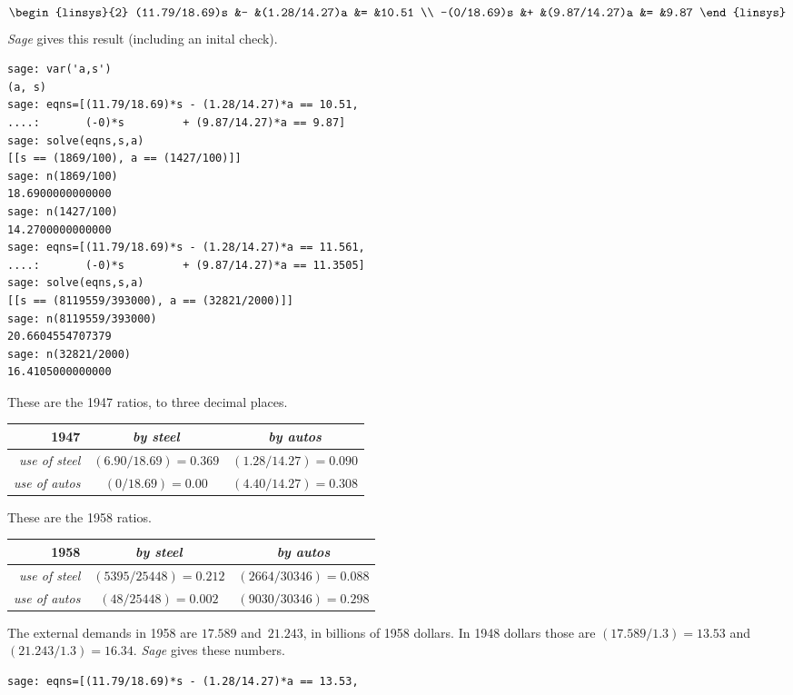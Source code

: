 \begin{exercises}
\begin{answer}
\begin{exparts}
\begin{equation*}
\begin{linsys}{2}
	       (11.79/18.69)s   &-   &(1.28/14.27)a &= &10.51 \\ 
	       -(0/18.69)s   &+   &(9.87/14.27)a &= &9.87 
	    \end{linsys}
	  \end{equation*}
          \textit{Sage} gives this result (including an inital check).
\begin{lstlisting}
sage: var('a,s')
(a, s)
sage: eqns=[(11.79/18.69)*s - (1.28/14.27)*a == 10.51,
....:       (-0)*s         + (9.87/14.27)*a == 9.87]
sage: solve(eqns,s,a)
[[s == (1869/100), a == (1427/100)]]
sage: n(1869/100)
18.6900000000000
sage: n(1427/100)
14.2700000000000
sage: eqns=[(11.79/18.69)*s - (1.28/14.27)*a == 11.561,
....:       (-0)*s         + (9.87/14.27)*a == 11.3505]
sage: solve(eqns,s,a)
[[s == (8119559/393000), a == (32821/2000)]]
sage: n(8119559/393000)
20.6604554707379
sage: n(32821/2000)
16.4105000000000            
\end{lstlisting}
	\partsitem
          These are the 1947 ratios, to three decimal places.
	  \begin{center}
            \begin{tabular}{r|cc}
               1947   &\textit{by steel}  &\textit{by autos}  \\ \hline
               \textit{use of steel}  &$(6.90/18.69)=0.369$ &$(1.28/14.27)=0.090$  \\
               \textit{use of autos}  &$(0/18.69)=0.00$ &$(4.40/14.27)=0.308$  
            \end{tabular}
          \end{center}
          These are the 1958 ratios.
          \begin{center}
            \begin{tabular}{r|cc}
               1958           &\textit{by steel}  &\textit{by autos}  \\ \hline
               \textit{use of steel}  &$(5395/25448)=0.212$ &$(2664/30346)=0.088$  \\
               \textit{use of autos}  &$(48/25448)=0.002$ &$(9030/30346)=0.298$  
            \end{tabular}
          \end{center}
	\partsitem
          The external demands in 1958 are $17.589$ and~$21.243$,
          in billions of 1958 dollars.
          In 1948 dollars those are $(17.589/1.3)=13.53$ and
          $(21.243/1.3)=16.34$. 
          \textit{Sage} gives these numbers.
\begin{lstlisting}
sage: eqns=[(11.79/18.69)*s - (1.28/14.27)*a == 13.53,

\end{lstlisting}
\end{exparts}
\end{answer}
\end{exercises}
